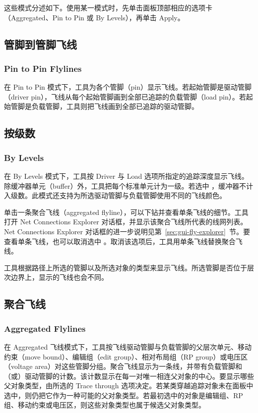 这些模式分述如下。使用某一模式时，先单击面板顶部相应的选项卡（Aggregated、Pin to Pin 或 By Levels），再单击 Apply。

\subsection{管脚到管脚飞线}
\subsubsection*{Pin to Pin Flylines}

在 Pin to Pin 模式下，工具为各个管脚（pin）显示飞线。若起始管脚是驱动管脚（driver pin），飞线从每个起始管脚画到全部已追踪的负载管脚（load pin）。若起始管脚是负载管脚，工具则把飞线画到全部已追踪的驱动管脚。

\subsection{按级数}
\subsubsection*{By Levels}

在 By Levels 模式下，工具按 Driver 与 Load 选项所指定的追踪深度显示飞线。除缓冲器单元（buffer）外，工具把每个标准单元计为一级。若选中 ，缓冲器不计入级数。此模式还支持为所选驱动管脚与负载管脚使用不同的飞线颜色。

单击一条聚合飞线（aggregated flyline），可以下钻并查看单条飞线的细节。工具打开 Net Connections Explorer 对话框，并显示该聚合飞线所代表的线网列表。Net Connections Explorer 对话框的进一步说明见第~\ref{sec:gui-fly-explorer}~节。要查看单条飞线，也可以取消选中 。取消该选项后，工具用单条飞线替换聚合飞线。

\begin{noteBox}
工具根据路径上所选的管脚以及所选对象的类型来显示飞线。所选管脚是否位于层次边界上，显示的飞线也会不同。
\end{noteBox}

\subsection{聚合飞线}
\subsubsection*{Aggregated Flylines}

在 Aggregated 飞线模式下，工具按飞线驱动管脚与负载管脚的父层次单元、移动约束（move bound）、编辑组（edit group）、相对布局组（RP group）或电压区（voltage area）对这些管脚分组。聚合飞线显示为一条线，并带有负载管脚和（或）驱动管脚的计数。该计数显示在每一对唯一相连父对象的中心。要显示哪些父对象类型，由所选的 Trace through 选项决定。若某类穿越追踪对象未在面板中选中，则仍把它作为一种可能的父对象类型。若最初选中的对象是编辑组、RP 组、移动约束或电压区，则这些对象类型也属于候选父对象类型。

